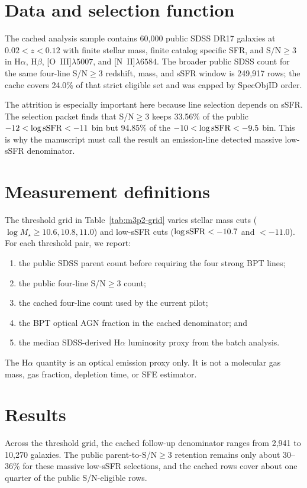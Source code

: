 \documentclass[twocolumn]{aastex631}
\begin{document}
\section{Data and selection function}\label{sec:data}
The cached analysis sample contains 60,000 public SDSS DR17 galaxies at $0.02<z<0.12$ with finite stellar mass, finite catalog specific SFR, and S/N$\geq3$ in H$\alpha$, H$\beta$, [O~III]$\lambda5007$, and [N~II]$\lambda6584$.  The broader public SDSS count for the same four-line S/N$\geq3$ redshift, mass, and sSFR window is 249,917 rows; the cache covers 24.0\% of that strict eligible set and was capped by SpecObjID order.

The attrition is especially important here because line selection depends on sSFR.  The selection packet finds that S/N$\geq3$ keeps 33.56\% of the public $-12<\log {\rm sSFR}<-11$ bin but 94.85\% of the $-10<\log {\rm sSFR}<-9.5$ bin.  This is why the manuscript must call the result an emission-line detected massive low-sSFR denominator.

\section{Measurement definitions}\label{sec:methods}
The threshold grid in Table~\ref{tab:m3p2-grid} varies stellar mass cuts ($\log M_\star\geq10.6, 10.8, 11.0$) and low-sSFR cuts ($\log {\rm sSFR}<-10.7$ and $<-11.0$).  For each threshold pair, we report:
\begin{enumerate}
\item the public SDSS parent count before requiring the four strong BPT lines;
\item the public four-line S/N$\geq3$ count;
\item the cached four-line count used by the current pilot;
\item the BPT optical AGN fraction in the cached denominator; and
\item the median SDSS-derived H$\alpha$ luminosity proxy from the batch analysis.
\end{enumerate}
The H$\alpha$ quantity is an optical emission proxy only.  It is not a molecular gas mass, gas fraction, depletion time, or SFE estimator.

\section{Results}\label{sec:results}
Across the threshold grid, the cached follow-up denominator ranges from 2,941 to 10,270 galaxies.  The public parent-to-S/N$\geq3$ retention remains only about 30--36\% for these massive low-sSFR selections, and the cached rows cover about one quarter of the public S/N-eligible rows.
\end{document}
